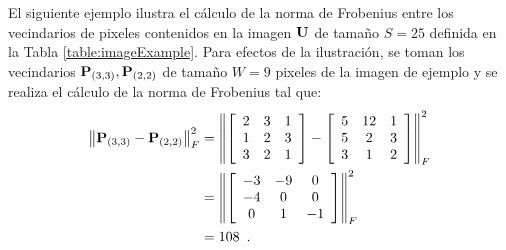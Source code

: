 El siguiente ejemplo ilustra el cálculo de la norma de Frobenius entre los vecindarios de pixeles contenidos en la imagen $\mathbf{U}$ de tama\~no $S=25$ definida en la Tabla \ref{table:imageExample}. Para efectos de la ilustración, se toman los vecindarios $\mathbf{P}_{\left(3,3\right)},\mathbf{P}_{\left(2,2\right)}$ de tama\~no $W=9$ pixeles de la imagen de ejemplo   y se realiza  el cálculo de la norma de Frobenius tal que:
%
\begin{equation}
\label{eq:resultado1}
\begin{split}
\left\Vert \mathbf{P}_{\left(3,3\right)}-\mathbf{P}_{\left(2,2\right)}\right\Vert_{F} ^{2} & =\left\Vert \left[\begin{array}{ccc}
2 & 3 & 1\\
1 & 2 & 3\\
3 & 2 & 1
\end{array} \right]-\left[\begin{array}{ccc}
5 & 12 & 1\\
5 & 2 & 3\\
3 & 1 & 2
\end{array}\right]\right\Vert_{F}^2 \\
& =\left\Vert\left[\begin{array}{ccc}
-3 & -9 & 0\\
-4 & 0 & 0\\
0 & 1 & -1
\end{array}\right]\right\Vert_{F}^2 \\
& =108 \enspace .
\end{split}
\end{equation}

